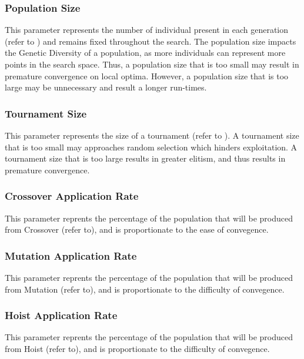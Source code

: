 \documentclass[a4paper,12pt]{article}
\begin{document}
        \subsubsection*{Population Size} \label{subsubsec:ps}
            \par{
                \noindent
                This parameter represents the number of individual present in each generation (refer to ) and remains fixed throughout the search. The population size impacts 
                the Genetic Diversity of a population, as more individuals can represent more points in the search space. Thus, a population size that is too small may result in premature convergence on
                local optima. However, a population size that is too large may be unnecessary and result a longer run-times. 
            }
        \subsubsection*{Tournament Size} \label{subsubsec:ts}
            \par{
                \noindent 
                This parameter represents the size of a tournament (refer to ). A tournament size that is too small may approaches random selection which hinders exploitation.
                A tournament size that is too large results in greater elitism, and thus results in premature convergence. 
            }
        \subsubsection*{Crossover Application Rate} \label{subsubsec:car}
            \par{
                \noindent
                This parameter reprents the percentage of the population that will be produced from Crossover (refer to), and is proportionate to the ease of convegence.
            }
        \subsubsection*{Mutation Application Rate} \label{subsubsec:mar}
            \par{
                \noindent
                This parameter reprents the percentage of the population that will be produced from Mutation (refer to), and is proportionate to the difficulty of convegence.
            }
        \subsubsection*{Hoist Application Rate} \label{subsubsec:har}
            \par{
                \noindent
                This parameter reprents the percentage of the population that will be produced from Hoist (refer to), and is proportionate to the difficulty of convegence.
            }
\end{document}
